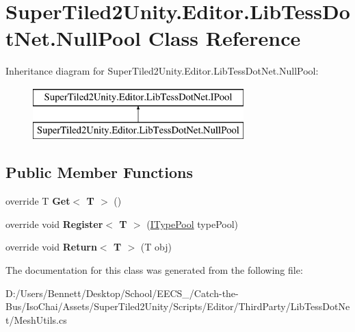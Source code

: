 \hypertarget{class_super_tiled2_unity_1_1_editor_1_1_lib_tess_dot_net_1_1_null_pool}{}\section{Super\+Tiled2\+Unity.\+Editor.\+Lib\+Tess\+Dot\+Net.\+Null\+Pool Class Reference}
\label{class_super_tiled2_unity_1_1_editor_1_1_lib_tess_dot_net_1_1_null_pool}
Inheritance diagram for Super\+Tiled2\+Unity.\+Editor.\+Lib\+Tess\+Dot\+Net.\+Null\+Pool\+:\begin{figure}[H]
\begin{center}
\leavevmode
\includegraphics[height=2.000000cm]{class_super_tiled2_unity_1_1_editor_1_1_lib_tess_dot_net_1_1_null_pool}
\end{center}
\end{figure}
\subsection*{Public Member Functions}
\begin{DoxyCompactItemize}
\item 
\mbox{\label{class_super_tiled2_unity_1_1_editor_1_1_lib_tess_dot_net_1_1_null_pool_a7c7cd97563fa9f3de7b6b53d3fc297cf}} 
override T {\bfseries Get$<$ T $>$} ()
\item 
\mbox{\label{class_super_tiled2_unity_1_1_editor_1_1_lib_tess_dot_net_1_1_null_pool_aaae683cd4cef96514a8c55856a795e7c}} 
override void {\bfseries Register$<$ T $>$} (\mbox{\hyperlink{interface_super_tiled2_unity_1_1_editor_1_1_lib_tess_dot_net_1_1_i_type_pool}{I\+Type\+Pool}} type\+Pool)
\item 
\mbox{\label{class_super_tiled2_unity_1_1_editor_1_1_lib_tess_dot_net_1_1_null_pool_a1a9ab1eecb28f2476d6b6e19d362d4a8}} 
override void {\bfseries Return$<$ T $>$} (T obj)
\end{DoxyCompactItemize}


The documentation for this class was generated from the following file\+:\begin{DoxyCompactItemize}
\item 
D\+:/\+Users/\+Bennett/\+Desktop/\+School/\+E\+E\+C\+S\+\_/\+Catch-\/the-\/\+Bus/\+Iso\+Chai/\+Assets/\+Super\+Tiled2\+Unity/\+Scripts/\+Editor/\+Third\+Party/\+Lib\+Tess\+Dot\+Net/Mesh\+Utils.\+cs\end{DoxyCompactItemize}
